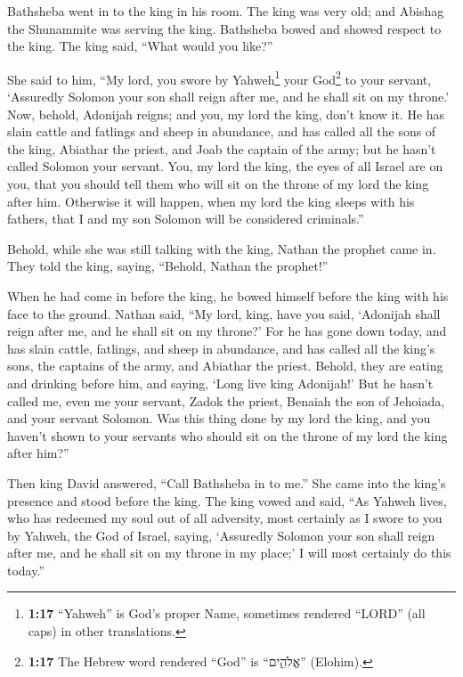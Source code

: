  Bathsheba went in to the king in his room. The king was
very old; and Abishag the Shunammite was serving the king.
 Bathsheba bowed and showed respect to the king. The king
said, ``What would you like?''

 She said to him, ``My lord, you swore by
Yahweh\footnote{\textbf{1:17} ``Yahweh'' is God's proper Name, sometimes
  rendered ``LORD'' (all caps) in other translations.} your
God\footnote{\textbf{1:17} The Hebrew word rendered ``God'' is
  ``אֱלֹהִ֑ים'' (Elohim).} to your servant, `Assuredly Solomon your son
shall reign after me, and he shall sit on my throne.' 
Now, behold, Adonijah reigns; and you, my lord the king, don't know it.
 He has slain cattle and fatlings and sheep in abundance,
and has called all the sons of the king, Abiathar the priest, and Joab
the captain of the army; but he hasn't called Solomon your servant.
 You, my lord the king, the eyes of all Israel are on
you, that you should tell them who will sit on the throne of my lord the
king after him.  Otherwise it will happen, when my lord
the king sleeps with his fathers, that I and my son Solomon will be
considered criminals.''

 Behold, while she was still talking with the king,
Nathan the prophet came in.  They told the king, saying,
``Behold, Nathan the prophet!''

When he had come in before the king, he bowed himself before the king
with his face to the ground.  Nathan said, ``My lord,
king, have you said, `Adonijah shall reign after me, and he shall sit on
my throne?'  For he has gone down today, and has slain
cattle, fatlings, and sheep in abundance, and has called all the king's
sons, the captains of the army, and Abiathar the priest. Behold, they
are eating and drinking before him, and saying, `Long live king
Adonijah!'  But he hasn't called me, even me your
servant, Zadok the priest, Benaiah the son of Jehoiada, and your servant
Solomon.  Was this thing done by my lord the king, and
you haven't shown to your servants who should sit on the throne of my
lord the king after him?''

 Then king David answered, ``Call Bathsheba in to me.''
She came into the king's presence and stood before the king.
 The king vowed and said, ``As Yahweh lives, who has
redeemed my soul out of all adversity,  most certainly as
I swore to you by Yahweh, the God of Israel, saying, `Assuredly Solomon
your son shall reign after me, and he shall sit on my throne in my
place;' I will most certainly do this today.''

